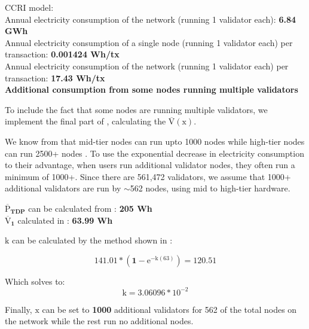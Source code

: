 CCRI model: \\
Annual electricity consumption of the network (running 1 validator each): \textbf{6.84 GWh} \\
Annual electricity consumption of a single node (running 1 validator each) per transaction: \textbf{0.001424 Wh/tx} \\
Annual electricity consumption of the network (running 1 validator each) per transaction: \textbf{17.43 Wh/tx} \\

\textbf{Additional consumption from some nodes running multiple validators}

To include the fact that some nodes are running multiple validators, we implement the final part of , calculating the $\boldsymbol{\mathrm{\overline{V}(\mathrm{x})}}$. 

We know from  that mid-tier nodes can run upto 1000 nodes while high-tier nodes can run 2500+ nodes \cite{2021HardwareEthstaker} \cite{Kaushal2022ValidatingConference}. To use the exponential decrease in electricity consumption to their advantage, when users run additional validator nodes, they often run a minimum of 1000+. Since there are 561,472 validators, we assume that 1000+ additional validators are run by $\sim$562 nodes, using mid to high-tier hardware.   

$\boldsymbol{\mathrm{\overline{P}}_{TDP}}$ can be calculated from : \textbf{205 Wh} \\
$\boldsymbol{ \overline{\mathrm{V}}_{1}}$ calculated in  : \textbf{63.99 Wh} 

$\boldsymbol{\mathrm{k}}$ can be calculated by the method shown in :

\begin{equation*}
    \boldsymbol{\mathrm{141.01} * (1-\mathrm{e}^{-\mathrm{k}(\mathrm{63})}) = \mathrm{120.51}}
\end{equation*}

Which solves to:
\begin{equation*}
    \boldsymbol{\mathrm{k} = \mathrm{{3.06096} * {10}^{-2}}}
\end{equation*}

Finally, $\boldsymbol{\mathrm{x}}$ can be set to \textbf{1000} additional validators for 562 of the total nodes on the network while the rest run no additional nodes.

